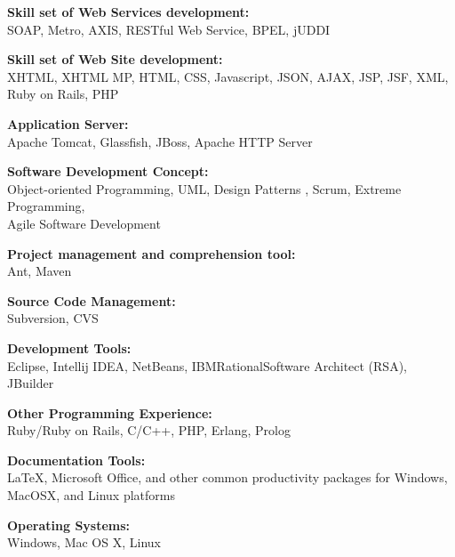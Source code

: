 \documentclass[10pt]{article}
\newcommand{\blankline}{\quad\pagebreak[2]}
\begin{document}
\blankline


{\textbf{Skill set of Web Services development:}}\\
SOAP, Metro, AXIS, RESTful Web Service, BPEL, jUDDI


\blankline


{\textbf{Skill set of Web Site development:}}\\
XHTML, XHTML MP, HTML, CSS, Javascript, JSON, AJAX, JSP, JSF, XML,\\ Ruby \nobreak on \nobreak Rails, PHP 

\blankline

{\textbf{Application Server:}}\\
Apache Tomcat, Glassfish, JBoss, Apache HTTP Server

\blankline

{\textbf{Software Development Concept:}}\\
Object-oriented Programming, UML, Design \nolinebreak Patterns
, Scrum, Extreme Programming,\\ Agile Software Development

\blankline

{\textbf{Project management and comprehension tool:}}\\
Ant, Maven

\blankline


{\textbf{Source Code Management:}}\\
Subversion, CVS

\blankline

{\textbf{Development Tools:}}\\
Eclipse, Intellij IDEA, NetBeans, IBM\circledR\space Rational\circledR\space Software Architect (RSA), JBuilder


\blankline

{\textbf{Other Programming Experience:}}\\
Ruby/Ruby on Rails, C/C++, PHP, Erlang, Prolog

\blankline

{\textbf{Documentation Tools:}}\\ 
\LaTeX{}, Microsoft Office,
and other common productivity packages for Windows,\\  Mac\nolinebreak OS\nolinebreak X, and
Linux platforms

\blankline

{\textbf{Operating Systems:}}\\
Windows, Mac OS X, Linux
\end{document}

